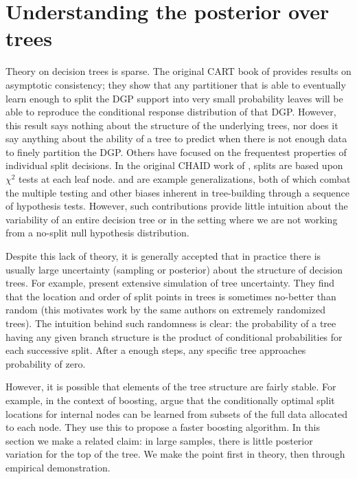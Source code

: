 \documentclass{article}
\begin{document}
    
    

\section{Understanding the posterior over trees}\label{treeuncertainty}


Theory on decision trees is sparse. The original CART book of
\citet{breiman_classification_1984} provides results on asymptotic consistency;
they show that any partitioner that is able to eventually learn enough to
split the DGP support into very small probability leaves will be able to
reproduce the conditional response distribution of that DGP. However, this
result says nothing about the structure of the underlying trees, nor does it
say anything about the ability of a tree to predict when there is not enough
data to finely partition the DGP.  Others have focused on the frequentest
properties of individual split decisions. In the original CHAID work of
\citet{kass_exploratory_1980}, splits are based upon $\chi^2$ tests at each
leaf node. \citet{loh_regression_2002} and
\citet{hothorn_unbiased_2006} are example generalizations, both of which
combat the multiple testing and other biases inherent in
tree-building through a sequence of hypothesis tests. However, such
contributions provide little intuition about the variability of an
entire decision tree or in the setting where we are not working from a
no-split null hypothesis distribution.

Despite this lack of theory, it is generally accepted that in practice there is
usually  large  uncertainty (sampling or posterior) about the
structure of decision trees. For example, \citet{geurts_investigation_2000}
present extensive simulation of tree
uncertainty. They find that the location and order of split points in
trees is sometimes no-better than random (this motivates work by the
same authors on extremely randomized trees). The intuition behind such randomness
is clear: the probability of a tree having any given branch structure is the
product of conditional probabilities for each successive split. After a enough
steps, any specific tree approaches probability of zero. 

However, it is possible that elements of the tree structure are
fairly stable. For example, in the context of boosting,
\citet{appel_quickly_2013} argue that the conditionally optimal
split locations for internal nodes can be learned from
subsets of the full data allocated to each node.  They use this to propose
a faster boosting algorithm. In this section we make a related claim: 
in large samples, there is little posterior variation for the top of the tree. 
We make the point first in theory, then through empirical demonstration.
\end{document}
